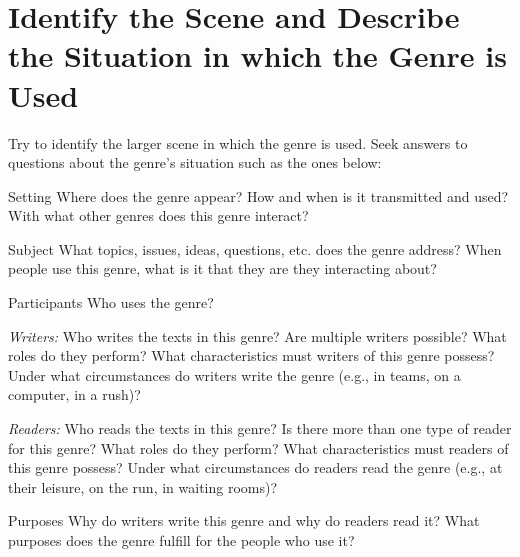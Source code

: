 \documentclass[10pt,article,oneside,twocolumn]{memoir}
\begin{document}
\section{Identify the Scene and Describe the Situation in which the Genre is Used} %
\label{sub:identify_the_scene_and_describe_the_situation_in_which_the_genre_is_used}
Try to identify the larger scene in which the genre is used. Seek answers to questions about the genre’s situation such as the ones below:
\begin{compactdesc}
	\item[Setting] Where does the genre appear? How and when is it transmitted and used? With what other genres does this genre interact?
	\item[Subject] What topics, issues, ideas, questions, etc. does the genre address? When people use this genre, what is it that they are they interacting about?
	\item[Participants] Who uses the genre?

\emph{Writers:} Who writes the texts in this genre? Are multiple writers possible? What roles do they perform? What characteristics must writers of this genre possess? Under what circumstances do writers write the genre (e.g., in teams, on a computer, in a rush)?

\emph{Readers:} Who reads the texts in this genre? Is there more than one type of reader for this genre? What roles do they perform? What characteristics must readers of this genre possess? Under what circumstances do readers read the genre (e.g., at their leisure, on the run, in waiting rooms)?
	\item[Purposes] Why do writers write this genre and why do readers read it? What purposes does the genre fulfill for the people who use it?
\end{compactdesc}
\end{document}
